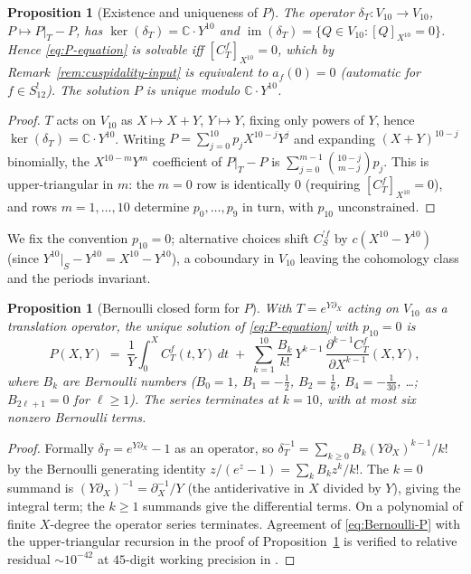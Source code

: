 \documentclass[11pt,letterpaper]{article}
\newtheorem{proposition}[theorem]{Proposition}
\newcommand{\CC}{\mathbb{C}}
\begin{document}
\begin{proposition}[Existence and uniqueness of $P$]\label{prop:P-exists}
The operator $\delta_T \colon V_{10} \to V_{10}$, $P \mapsto P|_T - P$,
has $\ker(\delta_T) = \CC\cdot Y^{10}$ and
$\operatorname{im}(\delta_T) = \{Q \in V_{10} : [Q]_{X^{10}} = 0\}$.
Hence \eqref{eq:P-equation} is solvable iff $[C^f_T]_{X^{10}} = 0$,
which by Remark~\ref{rem:cuspidality-input} is equivalent to $a_f(0) =
0$ (automatic for $f \in S_{12}^!$).  The solution $P$ is unique modulo
$\CC\cdot Y^{10}$.
\end{proposition}

\begin{proof}
$T$ acts on $V_{10}$ as $X \mapsto X+Y$, $Y \mapsto Y$, fixing only
powers of $Y$, hence $\ker(\delta_T) = \CC\cdot Y^{10}$.  Writing
$P = \sum_{j=0}^{10}p_j X^{10-j}Y^j$ and expanding $(X+Y)^{10-j}$
binomially, the $X^{10-m}Y^m$ coefficient of $P|_T - P$ is
$\sum_{j=0}^{m-1}\binom{10-j}{m-j}p_j$.  This is upper-triangular in
$m$: the $m=0$ row is identically $0$ (requiring $[C^f_T]_{X^{10}}=0$),
and rows $m = 1, \ldots, 10$ determine $p_0, \ldots, p_9$ in turn, with
$p_{10}$ unconstrained.
\end{proof}

We fix the convention $p_{10} = 0$; alternative choices shift
$C^{\prime f}_S$ by $c(X^{10} - Y^{10})$ (since
$Y^{10}|_S - Y^{10} = X^{10} - Y^{10}$), a coboundary in $V_{10}$
leaving the cohomology class and the periods invariant.

\begin{proposition}[Bernoulli closed form for $P$]\label{prop:Bernoulli-P}
With $T = e^{Y\partial_X}$ acting on $V_{10}$ as a translation operator,
the unique solution of \eqref{eq:P-equation} with $p_{10} = 0$ is
\begin{equation}\label{eq:Bernoulli-P}
  P(X, Y) \;=\; \frac{1}{Y}\!\int_0^X\! C^f_T(t, Y)\,dt
              \;+\; \sum_{k=1}^{10}\frac{B_k}{k!}\,Y^{k-1}\,
                    \frac{\partial^{k-1} C^f_T}{\partial X^{k-1}}(X, Y),
\end{equation}
where $B_k$ are Bernoulli numbers ($B_0 = 1$, $B_1 = -\tfrac12$,
$B_2 = \tfrac16$, $B_4 = -\tfrac{1}{30}$, \ldots; $B_{2\ell+1} = 0$ for
$\ell \ge 1$).  The series terminates at $k = 10$, with at most six
nonzero Bernoulli terms.
\end{proposition}

\begin{proof}
Formally $\delta_T = e^{Y\partial_X} - 1$ as an operator, so
$\delta_T^{-1} = \sum_{k\ge 0}B_k(Y\partial_X)^{k-1}/k!$ by the
Bernoulli generating identity $z/(e^z - 1) = \sum_k B_k z^k/k!$.  The
$k=0$ summand is $(Y\partial_X)^{-1} = \partial_X^{-1}/Y$ (the
antiderivative in $X$ divided by $Y$), giving the integral term; the
$k \ge 1$ summands give the differential terms.  On a polynomial of
finite $X$-degree the operator series terminates.  Agreement of
\eqref{eq:Bernoulli-P} with the upper-triangular recursion in the proof
of Proposition~\ref{prop:P-exists} is verified to relative residual
$\sim 10^{-42}$ at $45$-digit working precision in \cite{VerifyBernoulli}.
\end{proof}
\end{document}
